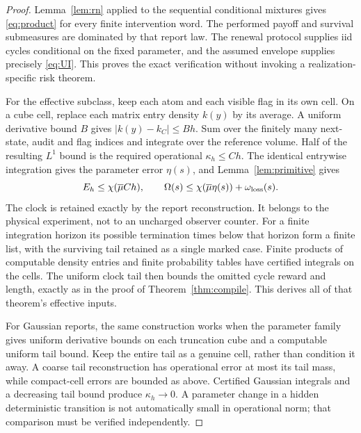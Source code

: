\begin{proof}
Lemma~\ref{lem:rn} applied to the sequential conditional mixtures gives \eqref{eq:product} for every finite intervention word. The performed payoff and survival submeasures are dominated by that report law. The renewal protocol supplies iid cycles conditional on the fixed parameter, and the assumed envelope supplies precisely \eqref{eq:UI}. This proves the exact verification without invoking a realization-specific risk theorem.

For the effective subclass, keep each atom and each visible flag in its own cell. On a cube cell, replace each matrix entry density $k(y)$ by its average. A uniform derivative bound $B$ gives $|k(y)-k_C|\le B h$. Sum over the finitely many next-state, audit and flag indices and integrate over the reference volume. Half of the resulting $L^1$ bound is the required operational $\kappa_h\le C h$. The identical entrywise integration gives the parameter error $\eta(s)$, and Lemma~\ref{lem:primitive} gives
\begin{equation}\label{eq:hidden-effective}
 E_h\le\chi(\overline\mu C h),\qquad
 \Omega(s)\le\chi(\overline\mu\eta(s))+\omega_{\rm loss}(s).
\end{equation}
The clock is retained exactly by the report reconstruction. It belongs to the physical experiment, not to an uncharged observer counter. For a finite integration horizon its possible termination times below that horizon form a finite list, with the surviving tail retained as a single marked case. Finite products of computable density entries and finite probability tables have certified integrals on the cells. The uniform clock tail then bounds the omitted cycle reward and length, exactly as in the proof of Theorem~\ref{thm:compile}. This derives all of that theorem's effective inputs.

For Gaussian reports, the same construction works when the parameter family gives uniform derivative bounds on each truncation cube and a computable uniform tail bound. Keep the entire tail as a genuine cell, rather than condition it away. A coarse tail reconstruction has operational error at most its tail mass, while compact-cell errors are bounded as above. Certified Gaussian integrals and a decreasing tail bound produce $\kappa_h\to0$. A parameter change in a hidden deterministic transition is not automatically small in operational norm; that comparison must be verified independently.
\end{proof}

